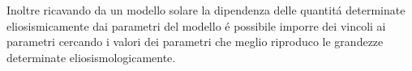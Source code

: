 \documentclass[../main.tex]{subfiles}
\begin{document}
Inoltre ricavando da un modello solare la dipendenza delle quantit\'a determinate eliosismicamente dai parametri del modello \'e possibile imporre dei vincoli ai parametri cercando i valori dei parametri che meglio riproduco le grandezze determinate eliosismologicamente.

\begin{workout}

\end{workout}

\end{document}
